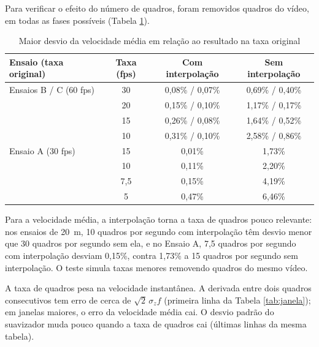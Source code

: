 \documentclass[
    12pt,               %
    openright,          %
    twoside,            %
    a4paper,            %
    chapter=TITLE,      %
    english,            %
    brazil              %
    ]{abntex2}
\begin{document}
Para verificar o efeito do número de quadros, foram removidos quadros do vídeo, em todas as fases possíveis (Tabela \ref{tab:fps}).

\begin{table}[H]
\centering
\small
\caption{Maior desvio da velocidade média em relação ao resultado na taxa original}
\label{tab:fps}
\footnotesize
\begin{tabular}{lccc}
\hline
\textbf{Ensaio (taxa original)} & \textbf{Taxa (fps)} & \textbf{Com interpolação} & \textbf{Sem interpolação} \\
\hline
Ensaios B / C (60 fps) & 30 & 0,08\% / 0,07\% & 0,69\% / 0,40\% \\
 & 20 & 0,15\% / 0,10\% & 1,17\% / 0,17\% \\
 & 15 & 0,26\% / 0,08\% & 1,64\% / 0,52\% \\
 & 10 & 0,31\% / 0,10\% & 2,58\% / 0,86\% \\
Ensaio A (30 fps) & 15 & 0,01\% & 1,73\% \\
 & 10 & 0,11\% & 2,20\% \\
 & 7,5 & 0,15\% & 4,19\% \\
 & 5 & 0,47\% & 6,46\% \\
\hline
\end{tabular}
\end{table}

Para a velocidade média, a interpolação torna a taxa de quadros pouco relevante: nos ensaios de 20~m, 10 quadros por segundo com interpolação têm desvio menor que 30 quadros por segundo sem ela, e no Ensaio A, 7,5 quadros por segundo com interpolação desviam 0,15\%, contra 1,73\% a 15 quadros por segundo sem interpolação. O teste simula taxas menores removendo quadros do mesmo vídeo.

A taxa de quadros pesa na velocidade instantânea. A derivada entre dois quadros consecutivos tem erro de cerca de $\sqrt{2}\,\sigma_z f$ (primeira linha da Tabela \ref{tab:janela}); em janelas maiores, o erro da velocidade média cai. O desvio padrão do suavizador muda pouco quando a taxa de quadros cai (últimas linhas da mesma tabela).
\end{document}
